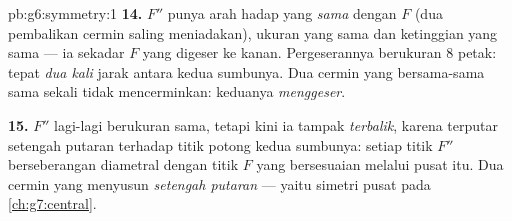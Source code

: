 \begin{solution}{pb:g6:symmetry:1}
\textbf{14.} $F''$ punya arah hadap yang \emph{sama} dengan $F$ (dua
pembalikan cermin saling meniadakan), ukuran yang sama dan ketinggian
yang sama --- ia sekadar $F$ yang digeser ke kanan. Pergeserannya
berukuran $8$ petak: tepat \emph{dua kali} jarak antara kedua
sumbunya. Dua cermin yang  bersama-sama sama sekali tidak
mencerminkan: keduanya \emph{menggeser}.

\textbf{15.} $F''$ lagi-lagi berukuran sama, tetapi kini ia tampak
\emph{terbalik}, karena terputar setengah putaran terhadap titik
potong kedua sumbunya: setiap titik $F''$ berseberangan diametral dengan titik
$F$ yang bersesuaian melalui pusat itu. Dua cermin yang 
menyusun \emph{setengah putaran} --- yaitu simetri pusat pada
\cref{ch:g7:central}.

\end{solution}
